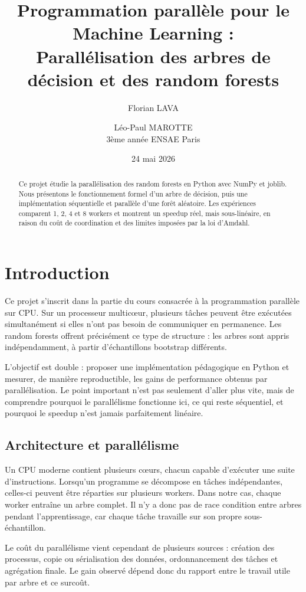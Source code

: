 \documentclass[11pt,a4paper]{article}
\title{Programmation parallèle pour le Machine Learning :\\Parallélisation des arbres de décision et des random forests}
\author{Florian LAVA \and Léo-Paul MAROTTE\\3ème année ENSAE Paris}
\date{24 mai 2026}
\begin{document}
\maketitle

\begin{abstract}
Ce projet étudie la parallélisation des random forests en Python avec NumPy et joblib. Nous présentons le fonctionnement formel d'un arbre de décision, puis une implémentation séquentielle et parallèle d'une forêt aléatoire. Les expériences comparent 1, 2, 4 et 8 workers et montrent un speedup réel, mais sous-linéaire, en raison du coût de coordination et des limites imposées par la loi d'Amdahl.
\end{abstract}

\section{Introduction}

Ce projet s'inscrit dans la partie du cours consacrée à la programmation parallèle sur CPU. Sur un processeur multicœur, plusieurs tâches peuvent être exécutées simultanément si elles n'ont pas besoin de communiquer en permanence. Les random forests offrent précisément ce type de structure : les arbres sont appris indépendamment, à partir d'échantillons bootstrap différents.

L'objectif est double : proposer une implémentation pédagogique en Python et mesurer, de manière reproductible, les gains de performance obtenus par parallélisation. Le point important n'est pas seulement d'aller plus vite, mais de comprendre pourquoi le parallélisme fonctionne ici, ce qui reste séquentiel, et pourquoi le speedup n'est jamais parfaitement linéaire.

\subsection{Architecture et parallélisme}

Un CPU moderne contient plusieurs cœurs, chacun capable d'exécuter une suite d'instructions. Lorsqu'un programme se décompose en tâches indépendantes, celles-ci peuvent être réparties sur plusieurs workers. Dans notre cas, chaque worker entraîne un arbre complet. Il n'y a donc pas de race condition entre arbres pendant l'apprentissage, car chaque tâche travaille sur son propre sous-échantillon.

Le coût du parallélisme vient cependant de plusieurs sources : création des processus, copie ou sérialisation des données, ordonnancement des tâches et agrégation finale. Le gain observé dépend donc du rapport entre le travail utile par arbre et ce surcoût.
\end{document}
